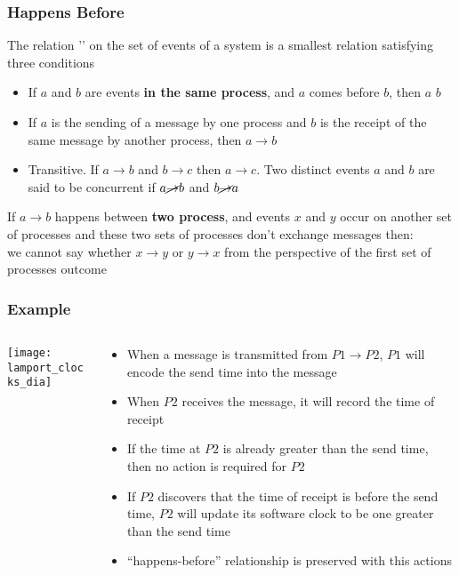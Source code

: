 \documentclass[aspectratio=169, 15pt,usenames,dvipsnames]{beamer}
\begin{document}
	\begin{gdblank}
		\frametitle{Happens Before}
		The relation '\rightarrow' on the set of events of a system is a smallest relation satisfying three conditions
		\begin{itemize}
			\item If $a$ and $b$ are events \textbf{in the same process}, and $a$ comes before $b$, then $a$ \rightarrow $b$ 
			\item If $a$ is the sending of a message by one process and $b$ is the receipt of the same message by another process, then $a\rightarrow b$
			\item Transitive. If $a\rightarrow b$ and $b\rightarrow c$ then $a\rightarrow c$. Two distinct events $a$ and $b$ are said to be concurrent if $a\cancel{\rightarrow} b$ and $b\cancel{\rightarrow} a$
		\end{itemize}				
		\par
		If $a\rightarrow b$ happens between \textbf{two process}, and events $x$ and $y$ occur on another set of processes and these two sets of processes don’t exchange messages then:\\
		we cannot say whether $x\rightarrow y$ or $y\rightarrow x$ from the perspective of the first set of processes
		\tiny outcome
	\end{gdblank}
	\begin{gdblank}
		\frametitle{Example}
		\begin{columns}
			\begin{column}{0.5\textwidth}
				\texttt{[image: lamport\_clocks\_dia]}			
			\end{column}
			\begin{column}{0.5\textwidth}
				\begin{itemize}
					\item When a message is transmitted from $P1 \rightarrow P2$, $P1$ will encode the send time into the message
					      \pause
					\item When $P2$ receives the message, it will record the time of receipt
					      \pause
					\item If the time at $P2$ is already greater than the send time, then no action is required for $P2$
					      \pause
					\item If $P2$ discovers that the time of receipt is before the send time, $P2$ will update its software clock to be one greater than the send time
					      \pause
					\item “happens-before” relationship is preserved with this actions
				\end{itemize}
			\end{column}	
		\end{columns}
	\end{gdblank}
\end{document}
